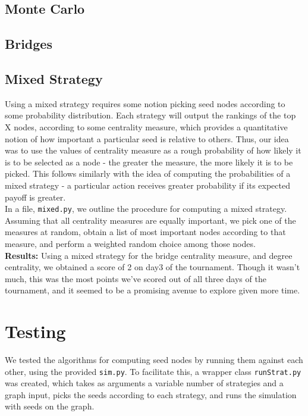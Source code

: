 \documentclass{article}
\begin{document}
\subsection*{Monte Carlo}

\subsection*{Bridges}

\subsection*{Mixed Strategy}
    Using a mixed strategy requires some notion picking seed nodes according to some
    probability distribution. Each strategy will output 
    the rankings of the top X nodes, according to some centrality measure, 
    which provides a quantitative notion of how important a particular seed is relative 
    to others. Thus, our idea was to use the values of centrality measure as a rough
    probability of how likely it is to be selected as a node - the greater the measure,
    the more likely it is to be picked. This follows similarly with the idea of computing
    the probabilities of a mixed strategy - a particular action receives greater 
    probability if its expected payoff is greater. 
    \\
    In a file, \texttt{mixed.py}, we outline the procedure for computing a mixed strategy.
    Assuming that all centrality measures are equally important, we pick one of the
    measures at random, obtain a list of most important nodes according to that measure,
    and perform a weighted random choice among those nodes.
    \\
    \textbf{Results:} Using a mixed strategy for the bridge centrality measure,
    and degree centrality, we obtained a score of 2 on day3 of 
    the tournament. Though it wasn't much,
    this was the most points we've scored out of all three days of the tournament,
    and it seemed to be a promising avenue to explore given more time.
    
\section{Testing}
    We tested the algorithms for computing seed nodes by running them against
    each other, using the provided \texttt{sim.py}. To facilitate this,
    a wrapper class \texttt{runStrat.py} was created, which takes as arguments
    a variable number of strategies and a graph input, picks the seeds according to each strategy,
    and runs the simulation with seeds on the graph.
\end{document}
